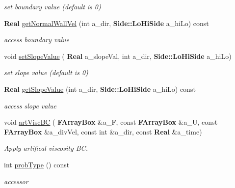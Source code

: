 \begin{DoxyCompactItemize}
\begin{DoxyCompactList}\small\item\em set boundary value (default is 0) \end{DoxyCompactList}\item 
\mbox{\label{class_vel_i_b_c_aa259704a1f32949bb7964674d9c6a0bf}} 
\textbf{ Real} \hyperlink{class_vel_i_b_c_aa259704a1f32949bb7964674d9c6a0bf}{get\+Normal\+Wall\+Vel} (int a\+\_\+dir, \textbf{ Side\+::\+Lo\+Hi\+Side} a\+\_\+hi\+Lo) const
\begin{DoxyCompactList}\small\item\em access boundary value \end{DoxyCompactList}\item 
\mbox{\label{class_vel_i_b_c_a927055b4423e2ff7f412a36a7c7f8072}} 
void \hyperlink{class_vel_i_b_c_a927055b4423e2ff7f412a36a7c7f8072}{set\+Slope\+Value} (\textbf{ Real} a\+\_\+slope\+Val, int a\+\_\+dir, \textbf{ Side\+::\+Lo\+Hi\+Side} a\+\_\+hi\+Lo)
\begin{DoxyCompactList}\small\item\em set slope value (default is 0) \end{DoxyCompactList}\item 
\mbox{\label{class_vel_i_b_c_a1c3c7d476c8890229ce3eee9533f5773}} 
\textbf{ Real} \hyperlink{class_vel_i_b_c_a1c3c7d476c8890229ce3eee9533f5773}{get\+Slope\+Value} (int a\+\_\+dir, \textbf{ Side\+::\+Lo\+Hi\+Side} a\+\_\+hi\+Lo) const
\begin{DoxyCompactList}\small\item\em access slope value \end{DoxyCompactList}\item 
\mbox{\label{class_vel_i_b_c_a16760cd6971354c37ebe7e7482446ec4}} 
void \hyperlink{class_vel_i_b_c_a16760cd6971354c37ebe7e7482446ec4}{art\+Visc\+BC} (\textbf{ F\+Array\+Box} \&a\+\_\+F, const \textbf{ F\+Array\+Box} \&a\+\_\+U, const \textbf{ F\+Array\+Box} \&a\+\_\+div\+Vel, const int \&a\+\_\+dir, const \textbf{ Real} \&a\+\_\+time)
\begin{DoxyCompactList}\small\item\em Apply artifical viscosity BC. \end{DoxyCompactList}\item 
\mbox{\label{class_vel_i_b_c_af9cf29e58072a3c4e761af7e2fc2acb5}} 
int \hyperlink{class_vel_i_b_c_af9cf29e58072a3c4e761af7e2fc2acb5}{prob\+Type} () const
\begin{DoxyCompactList}\small\item\em accessor \end{DoxyCompactList}\end{DoxyCompactItemize}
